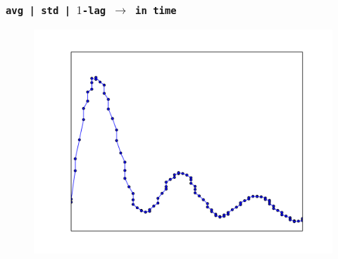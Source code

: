 \documentclass{beamer}
\begin{document}
  \begin{frame}[foot]
    \frametitle{\texttt{avg | std | \texttt{$1$-lag} $\rightarrow$ in time}}
    \begin{figure}
       \vspace*{-2em}
       {
       \hspace*{-2.5em}
       {{

       \colorbox{lightred}{ \includegraphics[scale=.22]{./gfx/feature1.png} }


       \hspace*{0.1em}
       
}}}
\end{figure}
\end{frame}
\end{document}
